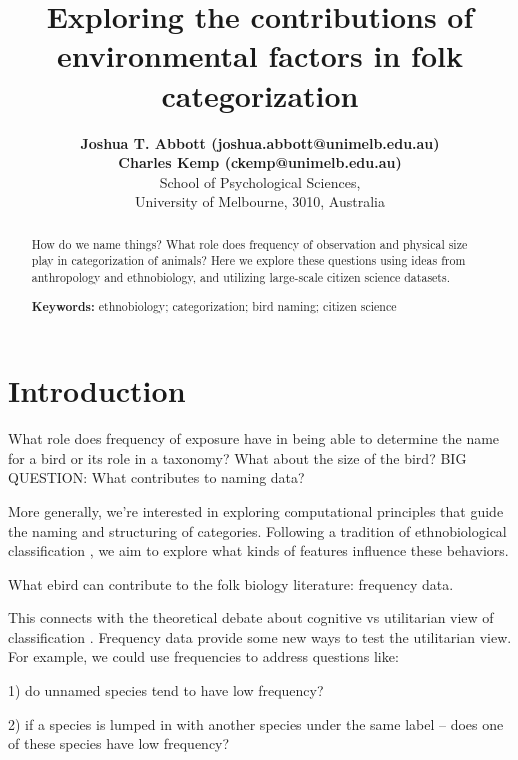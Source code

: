 \documentclass[10pt,letterpaper]{article}
\title{Exploring the contributions of environmental factors in folk categorization}
\author{{\large \bf Joshua T. Abbott (joshua.abbott@unimelb.edu.au)} \\
 {\large \bf Charles Kemp (ckemp@unimelb.edu.au)} \\
  School of Psychological Sciences,  \\
  University of Melbourne, 3010, Australia}
\begin{document}
\maketitle


\begin{abstract}
How do we name things? What role does frequency of observation and physical size play in categorization of animals? Here we explore these questions using ideas from anthropology and ethnobiology, and utilizing large-scale citizen science datasets.

\textbf{Keywords:} 
ethnobiology; categorization; bird naming; citizen science
\end{abstract}


\section{Introduction}

What role does frequency of exposure have in being able to determine the name for a bird or its role in a taxonomy? What about the size of the bird? BIG QUESTION: What contributes to naming data?

More generally, we're interested in exploring computational principles that guide the naming and structuring of categories. Following a tradition of ethnobiological classification \cite{berlin1973general,berlin2014ethnobiological}, we aim to explore what kinds of features influence these behaviors. 



What ebird can contribute to the folk biology literature: frequency data.

This connects with the theoretical debate about cognitive vs utilitarian view of classification \cite{hunn1982utilitarian,lopez1997tree}. Frequency data provide some new ways to test the utilitarian view. For example, we could use frequencies to address questions like:

1) do unnamed species tend to have low frequency?

2) if a species is lumped in with another species under the same label -- does one of these species have low frequency?
\end{document}
